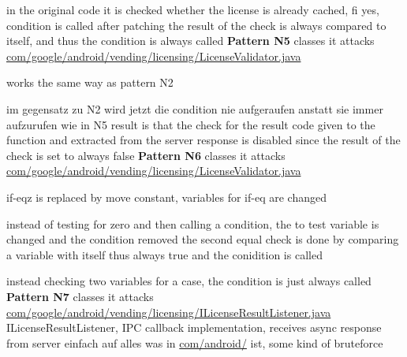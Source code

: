 in the original code it is checked whether the license is already cached, fi yes, condition is called
after patching the result of the check is always compared to itself, and thus  the condition is always called
\newline
\newline
\textbf{Pattern N5}\newline
classes it attacks
\url{com/google/android/vending/licensing/LicenseValidator.java}

works the same way as pattern N2

im gegensatz zu N2 wird jetzt die condition nie aufgeraufen anstatt sie immer aufzurufen wie in N5
result is that the check for the result code given to the function and extracted from the server response is disabled since the result of the check is set to always false
\newline
\newline
\textbf{Pattern N6}\newline
classes it attacks
\url{com/google/android/vending/licensing/LicenseValidator.java}



if-eqz is replaced by move constant, variables for if-eq are changed



instead of testing for zero and then calling a condition, the to test variable is changed and the condition removed
the second equal check is done by comparing a variable with itself thus always true and the conidition is called



instead checking two variables for a case, the condition is just always called
\newline
\newline
\textbf{Pattern N7}\newline
classes it attacks
\url{com/google/android/vending/licensing/ILicenseResultListener.java}
ILicenseResultListener, IPC callback implementation, receives async response from server\cite{developersLicensingReference}
einfach auf alles was in \url{com/android/} ist, some kind of bruteforce

